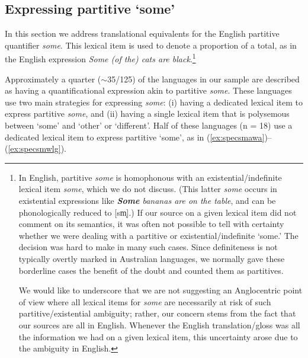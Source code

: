 \documentclass[12pt,egregdoesnotlikesansseriftitles]{scrartcl}
\begin{document}
\subsection{Expressing partitive `some'}
\label{sec:some}
In this section we address translational equivalents for the English partitive quantifier \textit{some}. This lexical item is used to denote a proportion of a total, as in the English expression \textit{Some (of the) cats are black}.\footnote{In English, partitive \textit{some} is homophonous with an existential/indefinite lexical item \textit{some}, which we do not discuss. (This latter \textit{some} occurs in existential expressions like \textit{\textbf{Some} bananas are on the table}, and can be phonologically reduced to [{\charis sm̩]}.) If our source on a given lexical item did not comment on its semantics, it was often not possible to tell with certainty whether we were dealing with a partitive or existential/indefinite `some.' The decision was hard to make in many such cases. Since definiteness is not typically overtly marked in Australian languages, we normally gave these borderline cases the benefit of the doubt and counted them as partitives. %



We would  like to underscore that we are not suggesting an Anglocentric point of view where all lexical items for \textit{some} are necessarily at risk of such partitive/existential ambiguity; rather, our concern stems from the fact that our sources are all in English. Whenever the English translation/gloss was all the information we had on a given lexical item, this uncertainty arose due to the ambiguity in English.} %

Approximately a quarter ($\sim$35/125) of the languages in our sample are described as having a quantificational expression akin to partitive \textit{some}. These languages use two main strategies for expressing \textit{some}: (i) having a dedicated lexical item to express partitive \textit{some}, and (ii) having a single lexical item that is polysemous between `some' and `other' or `different'. Half of these languages (n = 18) use a dedicated lexical item to express partitive `some', as in (\ref{ex:specsmawa})--(\ref{ex:specsmwlg}).
\end{document}
